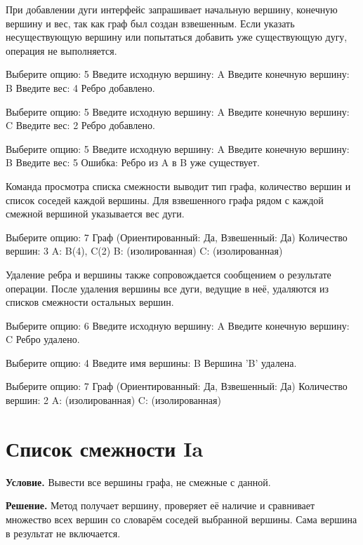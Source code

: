 \documentclass[pract]{SCWorks}
\begin{document}
    При добавлении дуги интерфейс запрашивает начальную вершину, конечную вершину и вес, так как граф был создан взвешенным.
    Если указать несуществующую вершину или попытаться добавить уже существующую дугу, операция не выполняется.

    \begin{plaincode}
Выберите опцию: 5
Введите исходную вершину: A
Введите конечную вершину: B
Введите вес: 4
Ребро добавлено.

Выберите опцию: 5
Введите исходную вершину: A
Введите конечную вершину: C
Введите вес: 2
Ребро добавлено.

Выберите опцию: 5
Введите исходную вершину: A
Введите конечную вершину: B
Введите вес: 5
Ошибка: Ребро из A в B уже существует.
    \end{plaincode}

    Команда просмотра списка смежности выводит тип графа, количество вершин и список соседей каждой вершины.
    Для взвешенного графа рядом с каждой смежной вершиной указывается вес дуги.

    \begin{plaincode}
Выберите опцию: 7
Граф (Ориентированный: Да, Взвешенный: Да)
Количество вершин: 3
A: B(4), C(2)
B: (изолированная)
C: (изолированная)
    \end{plaincode}

    Удаление ребра и вершины также сопровождается сообщением о результате операции.
    После удаления вершины все дуги, ведущие в неё, удаляются из списков смежности остальных вершин.

    \begin{plaincode}
Выберите опцию: 6
Введите исходную вершину: A
Введите конечную вершину: C
Ребро удалено.

Выберите опцию: 4
Введите имя вершины: B
Вершина 'B' удалена.

Выберите опцию: 7
Граф (Ориентированный: Да, Взвешенный: Да)
Количество вершин: 2
A: (изолированная)
C: (изолированная)
    \end{plaincode}

    \section{Список смежности Ia}

    \textbf{Условие.}
    Вывести все вершины графа, не смежные с данной.

    \textbf{Решение.}
    Метод получает вершину, проверяет её наличие и сравнивает множество всех вершин со словарём соседей выбранной вершины.
    Сама вершина в результат не включается.
\end{document}

